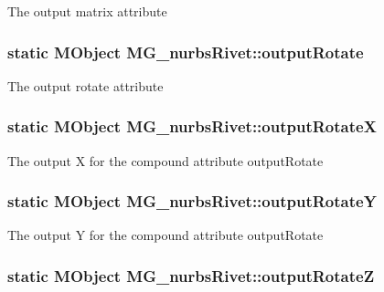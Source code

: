 The output matrix attribute \hypertarget{class_m_g__nurbs_rivet_a446ab71986b82fe1e09210e5f467e010}{
\subsubsection[{output\-Rotate}]{\setlength{\rightskip}{0pt plus 5cm}static M\-Object M\-G\-\_\-nurbs\-Rivet\-::output\-Rotate\hspace{0.3cm}{\ttfamily [static]}}}\label{class_m_g__nurbs_rivet_a446ab71986b82fe1e09210e5f467e010}
The output rotate attribute \hypertarget{class_m_g__nurbs_rivet_a55491d93e5402c09f4463e8729a83c57}{
\subsubsection[{output\-Rotate\-X}]{\setlength{\rightskip}{0pt plus 5cm}static M\-Object M\-G\-\_\-nurbs\-Rivet\-::output\-Rotate\-X\hspace{0.3cm}{\ttfamily [static]}}}\label{class_m_g__nurbs_rivet_a55491d93e5402c09f4463e8729a83c57}
The output X for the compound attribute output\-Rotate \hypertarget{class_m_g__nurbs_rivet_a36757fb01097b3063e8ab7e09d33b104}{
\subsubsection[{output\-Rotate\-Y}]{\setlength{\rightskip}{0pt plus 5cm}static M\-Object M\-G\-\_\-nurbs\-Rivet\-::output\-Rotate\-Y\hspace{0.3cm}{\ttfamily [static]}}}\label{class_m_g__nurbs_rivet_a36757fb01097b3063e8ab7e09d33b104}
The output Y for the compound attribute output\-Rotate \hypertarget{class_m_g__nurbs_rivet_aa561c384be7c4fc5634436c491af7aef}{
\subsubsection[{output\-Rotate\-Z}]{\setlength{\rightskip}{0pt plus 5cm}static M\-Object M\-G\-\_\-nurbs\-Rivet\-::output\-Rotate\-Z\hspace{0.3cm}{\ttfamily [static]}}}\label{class_m_g__nurbs_rivet_aa561c384be7c4fc5634436c491af7aef}

